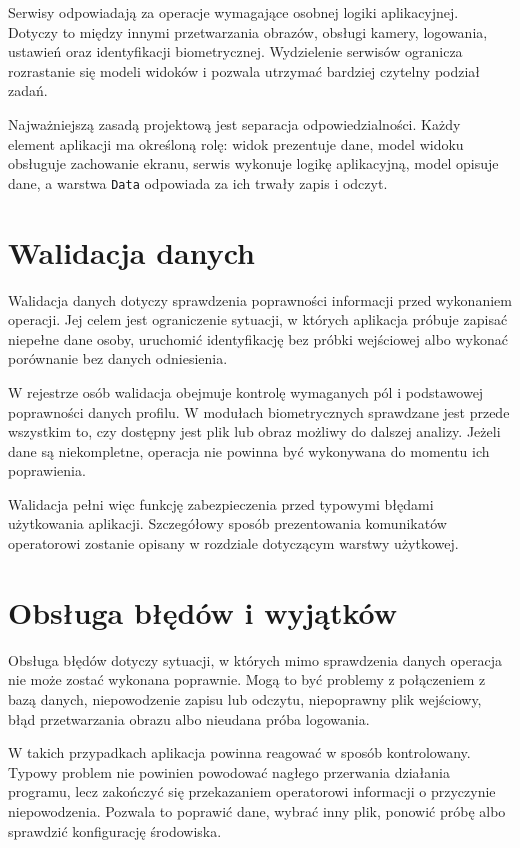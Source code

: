 Serwisy odpowiadają za operacje wymagające osobnej logiki aplikacyjnej. Dotyczy to między innymi przetwarzania obrazów, obsługi kamery, logowania, ustawień oraz identyfikacji biometrycznej. Wydzielenie serwisów ogranicza rozrastanie się modeli widoków i pozwala utrzymać bardziej czytelny podział zadań.

Najważniejszą zasadą projektową jest separacja odpowiedzialności. Każdy element aplikacji ma określoną rolę: widok prezentuje dane, model widoku obsługuje zachowanie ekranu, serwis wykonuje logikę aplikacyjną, model opisuje dane, a warstwa \texttt{Data} odpowiada za ich trwały zapis i odczyt.

\section{Walidacja danych}

Walidacja danych dotyczy sprawdzenia poprawności informacji przed wykonaniem operacji. Jej celem jest ograniczenie sytuacji, w których aplikacja próbuje zapisać niepełne dane osoby, uruchomić identyfikację bez próbki wejściowej albo wykonać porównanie bez danych odniesienia.

W rejestrze osób walidacja obejmuje kontrolę wymaganych pól i podstawowej poprawności danych profilu. W modułach biometrycznych sprawdzane jest przede wszystkim to, czy dostępny jest plik lub obraz możliwy do dalszej analizy. Jeżeli dane są niekompletne, operacja nie powinna być wykonywana do momentu ich poprawienia.

Walidacja pełni więc funkcję zabezpieczenia przed typowymi błędami użytkowania aplikacji. Szczegółowy sposób prezentowania komunikatów operatorowi zostanie opisany w rozdziale dotyczącym warstwy użytkowej.

\section{Obsługa błędów i wyjątków}

Obsługa błędów dotyczy sytuacji, w których mimo sprawdzenia danych operacja nie może zostać wykonana poprawnie. Mogą to być problemy z połączeniem z bazą danych, niepowodzenie zapisu lub odczytu, niepoprawny plik wejściowy, błąd przetwarzania obrazu albo nieudana próba logowania.

W takich przypadkach aplikacja powinna reagować w sposób kontrolowany. Typowy problem nie powinien powodować nagłego przerwania działania programu, lecz zakończyć się przekazaniem operatorowi informacji o przyczynie niepowodzenia. Pozwala to poprawić dane, wybrać inny plik, ponowić próbę albo sprawdzić konfigurację środowiska.

